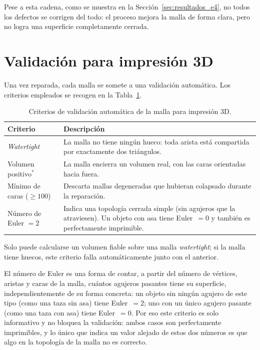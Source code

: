 \documentclass[10pt,a4paper]{report}
\begin{document}
Pese a esta cadena, como se muestra en la Sección~\ref{sec:resultados_e4}, no todos los
defectos se corrigen del todo: el proceso mejora la malla de forma clara, pero no logra una superficie completamente cerrada.
\section{Validación para impresión 3D}
\label{sec:validacion}

Una vez reparada, cada malla se somete a una validación automática. Los criterios
empleados se recogen en la Tabla~\ref{tab:validacion}.

\begin{table}[H]
  \centering
  \begin{threeparttable}
  \begin{tabularx}{\linewidth}{lX}
    \toprule
    Criterio & Descripción \\
    \midrule
    \textit{Watertight} &
      La malla no tiene ningún hueco: toda arista está compartida por exactamente
      dos triángulos. \\
    Volumen positivo$^*$ &
      La malla encierra un volumen real, con las caras orientadas hacia fuera. \\
    Mínimo de caras ($\geq 100$) &
      Descarta mallas degeneradas que hubieran colapsado durante la reparación. \\
    Número de Euler $= 2$ &
      Indica una topología cerrada simple (sin agujeros que la atraviesen).
      Un objeto con asa tiene Euler~$= 0$ y también es perfectamente imprimible. \\
    \bottomrule
  \end{tabularx}
  \begin{tablenotes}\footnotesize
    \item[$*$] Solo puede calcularse un volumen fiable sobre una malla \textit{watertight};
    si la malla tiene huecos, este criterio falla automáticamente junto con el anterior.
  \end{tablenotes}
  \caption{Criterios de validación automática de la malla para impresión 3D.}
  \label{tab:validacion}
  \end{threeparttable}
\end{table}

El número de Euler es una forma de contar, a partir del número de vértices, aristas y
caras de la malla, cuántos agujeros pasantes tiene su superficie, independientemente de su forma concreta: un objeto sin ningún agujero de este
tipo (como una taza sin asa) tiene Euler~$=2$; uno con un único agujero
pasante (como una taza con asa) tiene Euler~$=0$. Por eso este criterio es
solo informativo y no bloquea la validación: ambos casos son perfectamente
imprimibles, y lo único que indica un valor alejado de estos dos números es que algo en
la topología de la malla no es correcto.
\end{document}

